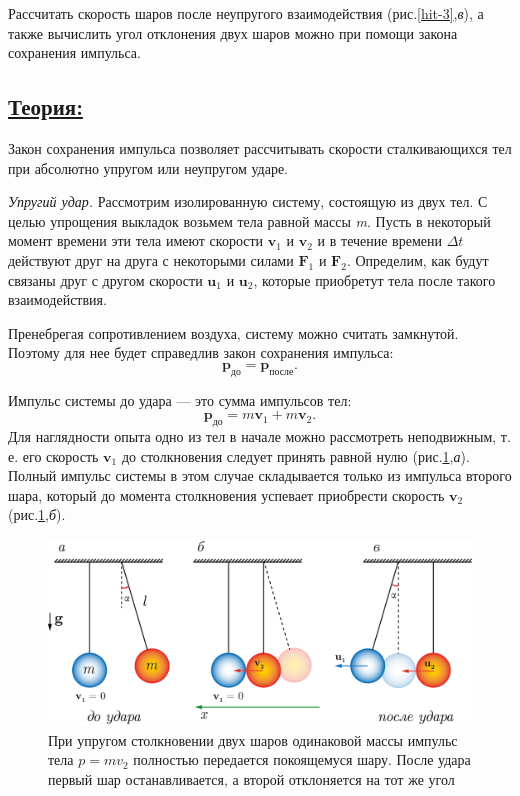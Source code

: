 \documentclass[14pt,a4paper,oneside]{extarticle}	%
\begin{document}
Рассчитать скорость шаров после неупругого взаимодействия (рис.\ref{hit-3},\textit{в}), а также вычислить угол отклонения двух шаров можно при помощи закона сохранения импульса.

\newpage
\subsection*{\underline{Теория:}}

Закон сохранения импульса позволяет рассчитывать скорости сталкивающихся тел при абсолютно упругом или неупругом ударе.

\textit{Упругий удар.}
Рассмотрим изолированную систему, состоящую из двух тел.
С целью упрощения выкладок возьмем тела равной массы \textit{m}.
Пусть в некоторый момент времени эти тела имеют скорости $ \textbf{v}_1 $ и  $ \textbf{v}_2 $ и в течение 
времени $ \Delta t $ действуют друг на друга с некоторыми силами $ \textbf{F}_1 $ и $ \textbf{F}_2 $.
Определим, как будут связаны друг с другом скорости $ \textbf{u}_1 $ и $ \textbf{u}_2 $, которые приобретут 
тела после такого взаимодействия.

Пренебрегая сопротивлением воздуха, систему можно считать замкнутой.
Поэтому для нее будет справедлив закон сохранения импульса:
	\begin{equation}\label{hit-1eq1}
\textbf{p}_{\text{до}}  = \textbf{p}_{\text{после}}.
\end{equation}

Импульс системы до удара — это сумма импульсов тел:
	\begin{equation}\label{hit-1eq2}
\textbf{p}_{\text{до}}  = m \textbf{v}_1 + m \textbf{v}_2.
\end{equation}
Для наглядности опыта одно из тел в начале можно рассмотреть неподвижным, т. е. его скорость $ \textbf{v}_1 $ до столкновения следует принять равной нулю (рис.\ref{hit-4},\textit{а}).
Полный импульс системы в этом случае складывается только из импульса второго шара, который до момента столкновения успевает приобрести скорость $ \textbf{v}_2 $ (рис.\ref{hit-4},\textit{б}).


\begin{figure}[H]
	\centering 	
	\includegraphics[width=0.9\linewidth]{hit-4.png}
	\caption{При упругом столкновении двух шаров одинаковой массы импульс тела $ p=mv_2 $ полностью передается покоящемуся шару. После удара первый шар останавливается, а второй отклоняется на тот же угол}
	\label{hit-4}
\end{figure}
\end{document}
